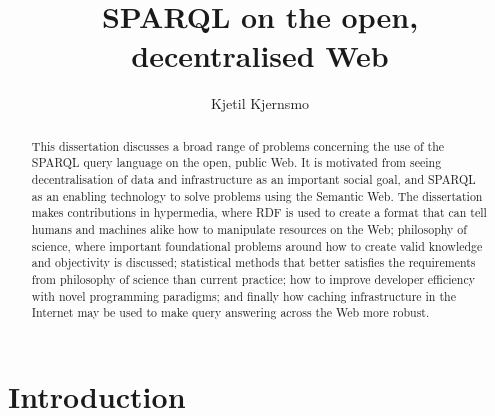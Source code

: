\documentclass[a4paper, 12pt, draft]{uiophd}
\begin{document}
\title{SPARQL on the open, decentralised Web}
\author{Kjetil Kjernsmo}


\frontmatter
\maketitle


\begin{abstract}
  This dissertation discusses a broad range of problems concerning the
  use of the SPARQL query language on the open, public Web. It is
  motivated from seeing decentralisation of data and infrastructure as
  an important social goal, and SPARQL as an enabling technology to
  solve problems using the Semantic Web. The dissertation makes
  contributions in hypermedia, where RDF is used to create a format
  that can tell humans and machines alike how to manipulate resources
  on the Web; philosophy of science, where important foundational
  problems around how to create valid knowledge and objectivity is
  discussed; statistical methods that better satisfies the
  requirements from philosophy of science than current practice; how
  to improve developer efficiency with novel programming paradigms;
  and finally how caching infrastructure in the Internet may be used
  to make query answering across the Web more robust.
\end{abstract}

\tableofcontents

\chapter{Introduction}











\end{document}
